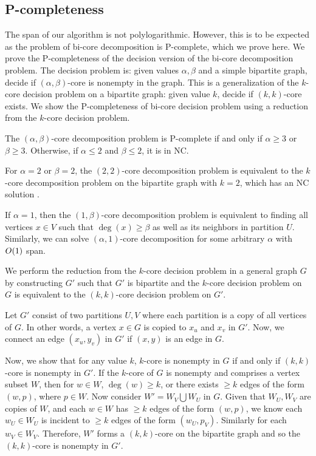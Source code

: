 \subsection{P-completeness}

The span of our algorithm is not polylogarithmic. However, this is to be expected as the problem of bi-core decomposition is P-complete, which we prove here. We prove the P-completeness of the decision version of the bi-core decomposition problem. The decision problem is: given values $\alpha, \beta$ and a simple bipartite graph, decide if $(\alpha, \beta)$-core is nonempty in the graph. This is a generalization of the $k$-core decision problem on a bipartite graph: given value $k$, decide if $(k,k)$-core exists. We show the P-completeness of bi-core decision problem using a reduction from the $k$-core decision problem. 

\begin{theorem}
The $(\alpha,\beta)$-core decomposition problem is P-complete if and only if $\alpha \ge 3$ or $\beta \ge 3$. Otherwise, if $\alpha \leq 2$ and $\beta \leq 2$, it is in NC.
\end{theorem}

For $\alpha= 2$ or $\beta= 2$, the $(2,2)$-core decomposition problem is equivalent to the $k$-core decomposition problem on the bipartite graph with $k=2$, which has an NC solution \cite{Anderson84}.

If $\alpha=1$, then the $(1,\beta)$-core decomposition problem is equivalent to finding all vertices $x\in V$ such that $\deg(x)\ge \beta$ as well as its neighbors in partition $U$. Similarly, we can solve $(\alpha,1)$-core decomposition for some arbitrary $\alpha$ with $O(1)$ span.

We perform the reduction from the $k$-core decision problem in a general graph $G$ by constructing $G'$ such that $G'$ is bipartite and the $k$-core decision problem on $G$ is equivalent to the $(k,k)$-core decision problem on $G'$. 

Let $G'$ consist of two partitions $U, V$ where each partition is a copy of all vertices of $G$. In other words, a vertex $x\in G$ is copied to $x_u$ and $x_v$ in $G'$. Now, we connect an edge $(x_u, y_v)$ in $G'$ if $(x,y)$ is an edge in $G$. 

Now, we show that for any value $k$, $k$-core is nonempty in $G$ if and only if $(k,k)$-core is nonempty in $G'$. If the $k$-core of $G$ is nonempty and comprises a vertex subset $W$, then for $w\in W$, $\deg(w)\ge k$, or there exists $\ge k$ edges of the form $(w, p)$, where $p\in W$. Now consider $W' = W_V\bigcup W_U$ in $G$. Given that $W_U, W_V$ are copies of $W$, and each $w\in W$ has $\ge k$ edges of the form $(w, p)$, we know each $w_U\in W_U$ is incident to $\ge k$ edges of the form $(w_U, p_V)$. Similarly for each $w_V\in W_V$. Therefore, $W'$ forms a $(k,k)$-core on the bipartite graph and so the $(k,k)$-core is nonempty in $G'$. 

